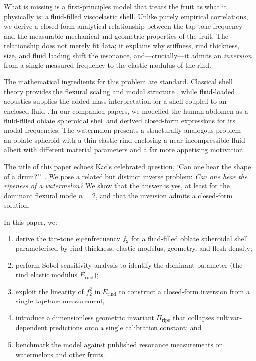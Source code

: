 What is missing is a first-principles model that treats the fruit as what
it physically is: a fluid-filled viscoelastic shell.  Unlike purely
empirical correlations, we derive a closed-form analytical relationship
between the tap-tone frequency and the measurable mechanical and
geometric properties of the fruit.  The relationship does not merely fit
data; it explains why stiffness, rind thickness, size, and fluid loading
shift the resonance, and---crucially---it admits an \emph{inversion} from
a single measured frequency to the elastic modulus of the rind.


The mathematical ingredients for this problem are standard.  Classical
shell theory provides the flexural scaling and modal structure
\cite{Leissa1973, Soedel2004}, while fluid-loaded acoustics supplies the
added-mass interpretation for a shell coupled to an enclosed fluid
\cite{MorseIngard1968, Junger1986}.  In our companion papers, we modelled
the human abdomen as a fluid-filled oblate spheroidal shell and derived
closed-form expressions for its modal frequencies.  The watermelon
presents a structurally analogous problem---an oblate spheroid with a
thin elastic rind enclosing a near-incompressible fluid---albeit with
different material parameters and a far more appetising motivation.


The title of this paper echoes Kac's celebrated question, `Can one hear
the shape of a drum?''~\cite{Kac1966}.  We pose a related but distinct
inverse problem: \emph{Can one hear the ripeness of a watermelon?}  We
show that the answer is yes, at least for the dominant flexural mode
$n = 2$, and that the inversion admits a closed-form solution.


In this paper, we:
\begin{enumerate}
  \item derive the tap-tone eigenfrequency $f_2$ for a fluid-filled
    oblate spheroidal shell parameterised by rind thickness, elastic
    modulus, geometry, and flesh density;
  \item perform Sobol sensitivity analysis to identify the dominant
    parameter (the rind elastic modulus $E_{\mathrm{rind}}$);
  \item exploit the linearity of $f_2^2$ in $E_{\mathrm{rind}}$ to
    construct a closed-form inversion from a single tap-tone measurement;
  \item introduce a dimensionless geometric invariant
    $\Pi_{\mathrm{ripe}}$ that collapses cultivar-dependent predictions
    onto a single calibration constant; and
  \item benchmark the model against published resonance measurements on
    watermelons and other fruits.
\end{enumerate}

